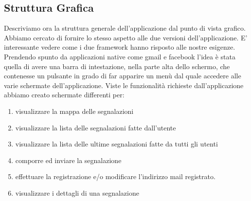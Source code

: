         \subsection{Struttura Grafica}
        \label{subsec:structgraphic}
            Descriviamo ora la struttura generale dell'applicazione dal punto
            di vista grafico.
            Abbiamo cercato di fornire lo stesso aspetto alle due versioni
            dell'applicazione. E' interessante vedere come i due framework hanno risposto
            alle nostre esigenze. Prendendo spunto da applicazioni native come
            gmail e facebook l'idea è stata quella di avere una barra di intestazione,
            nella parte alta dello schermo, che contenesse un pulsante in grado di
            far apparire un menù dal quale accedere alle varie schermate dell'applicazione.
            Viste le funzionalità richieste dall'applicazione abbiamo creato schermate
            differenti per:
            \begin{enumerate}
                \item visualizzare la mappa delle segnalazioni
                \item visualizzare la lista delle segnalazioni fatte dall'utente
                \item visualizzare la lista delle ultime segnalazioni fatte da tutti gli utenti
                \item comporre ed inviare la segnalazione
                \item effettuare la registrazione e/o modificare l'indirizzo mail registrato.
                \item visualizzare i dettagli di una segnalazione
            \end{enumerate}

